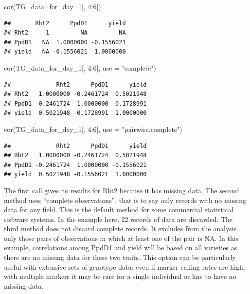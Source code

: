 \documentclass[
]{book}
\newenvironment{Shaded}{\begin{snugshade}}{\end{snugshade}}
\newcommand{\AttributeTok}[1]{\textcolor[rgb]{0.77,0.63,0.00}{#1}}
\newcommand{\DecValTok}[1]{\textcolor[rgb]{0.00,0.00,0.81}{#1}}
\newcommand{\FunctionTok}[1]{\textcolor[rgb]{0.00,0.00,0.00}{#1}}
\newcommand{\NormalTok}[1]{#1}
\newcommand{\SpecialCharTok}[1]{\textcolor[rgb]{0.00,0.00,0.00}{#1}}
\newcommand{\StringTok}[1]{\textcolor[rgb]{0.31,0.60,0.02}{#1}}
\begin{document}
\begin{Shaded}
\begin{Highlighting}[]
\FunctionTok{cor}\NormalTok{(TG\_data\_for\_day\_1[, }\DecValTok{4}\SpecialCharTok{:}\DecValTok{6}\NormalTok{])}
\end{Highlighting}
\end{Shaded}

\begin{verbatim}
##       Rht2      PpdD1      yield
## Rht2     1         NA         NA
## PpdD1   NA  1.0000000 -0.1556021
## yield   NA -0.1556021  1.0000000
\end{verbatim}

\begin{Shaded}
\begin{Highlighting}[]
\FunctionTok{cor}\NormalTok{(TG\_data\_for\_day\_1[, }\DecValTok{4}\SpecialCharTok{:}\DecValTok{6}\NormalTok{], }\AttributeTok{use =} \StringTok{"complete"}\NormalTok{)}
\end{Highlighting}
\end{Shaded}

\begin{verbatim}
##             Rht2      PpdD1      yield
## Rht2   1.0000000 -0.2461724  0.5021948
## PpdD1 -0.2461724  1.0000000 -0.1728991
## yield  0.5021948 -0.1728991  1.0000000
\end{verbatim}

\begin{Shaded}
\begin{Highlighting}[]
\FunctionTok{cor}\NormalTok{(TG\_data\_for\_day\_1[, }\DecValTok{4}\SpecialCharTok{:}\DecValTok{6}\NormalTok{], }\AttributeTok{use =} \StringTok{"pairwise.complete"}\NormalTok{)}
\end{Highlighting}
\end{Shaded}

\begin{verbatim}
##             Rht2      PpdD1      yield
## Rht2   1.0000000 -0.2461724  0.5021948
## PpdD1 -0.2461724  1.0000000 -0.1556021
## yield  0.5021948 -0.1556021  1.0000000
\end{verbatim}

The first call gives no results for Rht2 because it has missing data. The second method uses ``complete observations'', that is to say only records with no missing data for any field. This is the default method for some commercial statistical software systems. In the example here, 22 records of data are discarded. The third method does not discard complete records. It excludes from the analysis only those pairs of observations in which at least one of the pair is NA. In this example, correlations among PpdD1 and yield will be based on all varieties as there are no missing data for these two traits. This option can be particularly useful with extensive sets of genotype data: even if marker calling rates are high, with multiple markers it may be rare for a single individual or line to have no missing data.
\end{document}
